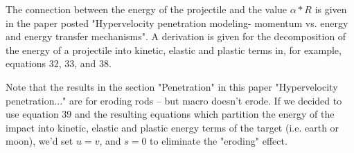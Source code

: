 \documentclass{article}
\begin{document}
The connection between the energy of the projectile and the value $\alpha*R$ is given in the paper posted "Hypervelocity penetration modeling- momentum vs. energy and energy transfer mechanisms". A derivation is given for the decomposition of the energy of a projectile into kinetic, elastic and plastic terms in, for example, equations 32, 33, and 38.

Note that the results in the section "Penetration" in this paper "Hypervelocity penetration..." are for eroding rods -- but macro doesn't erode.  If we decided to use equation 39 and the resulting equations which partition the energy of the impact into kinetic, elastic and plastic energy terms of the target (i.e. earth or moon), we'd set $u = v$, and $s = 0$ to eliminate the "eroding" effect.
\end{document}
